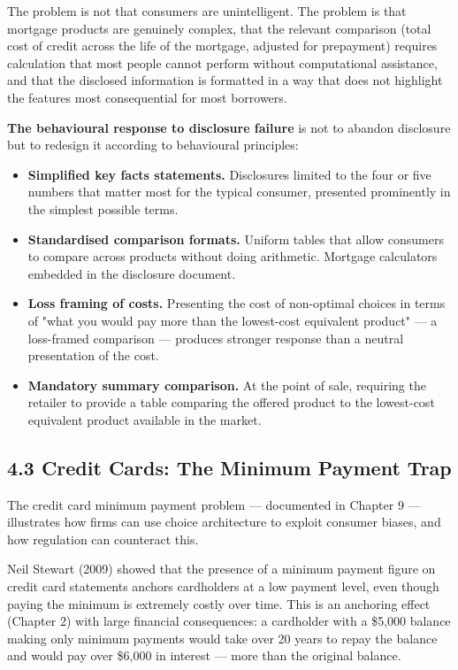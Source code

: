 \documentclass[12pt, letterpaper]{article}
\begin{document}
The problem is not that consumers are unintelligent. The problem is that mortgage products are genuinely complex, that the relevant comparison (total cost of credit across the life of the mortgage, adjusted for prepayment) requires calculation that most people cannot perform without computational assistance, and that the disclosed information is formatted in a way that does not highlight the features most consequential for most borrowers.

\textbf{The behavioural response to disclosure failure} is not to abandon disclosure but to redesign it according to behavioural principles:
\begin{itemize}
\item \textbf{Simplified key facts statements.} Disclosures limited to the four or five numbers that matter most for the typical consumer, presented prominently in the simplest possible terms.
\item \textbf{Standardised comparison formats.} Uniform tables that allow consumers to compare across products without doing arithmetic. Mortgage calculators embedded in the disclosure document.
\item \textbf{Loss framing of costs.} Presenting the cost of non-optimal choices in terms of "what you would pay more than the lowest-cost equivalent product" --- a loss-framed comparison --- produces stronger response than a neutral presentation of the cost.
\item \textbf{Mandatory summary comparison.} At the point of sale, requiring the retailer to provide a table comparing the offered product to the lowest-cost equivalent product available in the market.
\end{itemize}


\subsection{4.3 Credit Cards: The Minimum Payment Trap}


The credit card minimum payment problem --- documented in Chapter 9 --- illustrates how firms can use choice architecture to exploit consumer biases, and how regulation can counteract this.

Neil Stewart (2009) showed that the presence of a minimum payment figure on credit card statements anchors cardholders at a low payment level, even though paying the minimum is extremely costly over time. This is an anchoring effect (Chapter 2) with large financial consequences: a cardholder with a \$5,000 balance making only minimum payments would take over 20 years to repay the balance and would pay over \$6,000 in interest --- more than the original balance.
\end{document}
